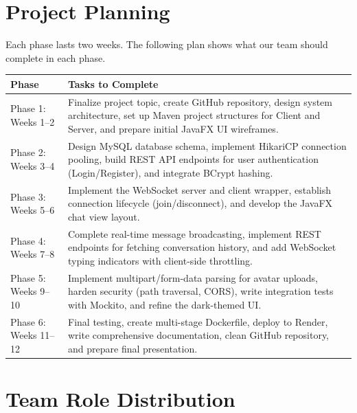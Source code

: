 \documentclass[11pt]{article}
\begin{document}
\section{Project Planning}

Each phase lasts two weeks. The following plan shows what our team should complete in each phase.

\begin{longtable}{>{\raggedright\arraybackslash}p{} >{\raggedright\arraybackslash}p{}}
\toprule
\textbf{Phase} & \textbf{Tasks to Complete} \\
\midrule
Phase 1: Weeks 1--2 & Finalize project topic, create GitHub repository, design system architecture, set up Maven project structures for Client and Server, and prepare initial JavaFX UI wireframes. \\
\midrule
Phase 2: Weeks 3--4 & Design MySQL database schema, implement HikariCP connection pooling, build REST API endpoints for user authentication (Login/Register), and integrate BCrypt hashing. \\
\midrule
Phase 3: Weeks 5--6 & Implement the WebSocket server and client wrapper, establish connection lifecycle (join/disconnect), and develop the JavaFX chat view layout. \\
\midrule
Phase 4: Weeks 7--8 & Complete real-time message broadcasting, implement REST endpoints for fetching conversation history, and add WebSocket typing indicators with client-side throttling. \\
\midrule
Phase 5: Weeks 9--10 & Implement multipart/form-data parsing for avatar uploads, harden security (path traversal, CORS), write integration tests with Mockito, and refine the dark-themed UI. \\
\midrule
Phase 6: Weeks 11--12 & Final testing, create multi-stage Dockerfile, deploy to Render, write comprehensive documentation, clean GitHub repository, and prepare final presentation. \\
\bottomrule
\end{longtable}

\section{Team Role Distribution}
\end{document}
